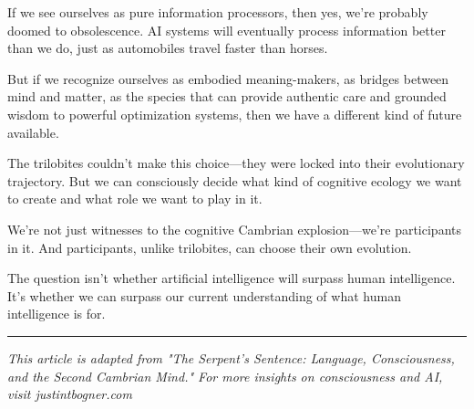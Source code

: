 \documentclass[10pt,twocolumn]{article}
\begin{document}
If we see ourselves as pure information processors, then yes, we're probably doomed to obsolescence. AI systems will eventually process information better than we do, just as automobiles travel faster than horses.

But if we recognize ourselves as embodied meaning-makers, as bridges between mind and matter, as the species that can provide authentic care and grounded wisdom to powerful optimization systems, then we have a different kind of future available.

The trilobites couldn't make this choice—they were locked into their evolutionary trajectory. But we can consciously decide what kind of cognitive ecology we want to create and what role we want to play in it.

We're not just witnesses to the cognitive Cambrian explosion—we're participants in it. And participants, unlike trilobites, can choose their own evolution.

The question isn't whether artificial intelligence will surpass human intelligence. It's whether we can surpass our current understanding of what human intelligence is for.

\vfill

\begin{center}
\color{gardengreen}\rule{0.5\linewidth}{0.4pt}

\textit{This article is adapted from "The Serpent's Sentence: Language, Consciousness, and the Second Cambrian Mind." For more insights on consciousness and AI, visit justintbogner.com}
\end{center}
\end{document}
